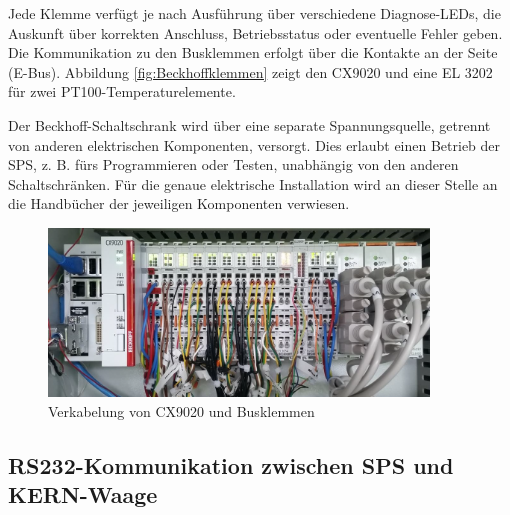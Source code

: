 Jede Klemme verfügt je nach Ausführung über verschiedene Diagnose-LEDs, die Auskunft über korrekten Anschluss, Betriebsstatus oder eventuelle Fehler geben. Die Kommunikation zu den Busklemmen erfolgt über die Kontakte an der Seite (E-Bus). Abbildung \ref{fig:Beckhoffklemmen} zeigt den CX9020 und eine EL 3202 für zwei PT100-Temperaturelemente. 

Der Beckhoff-Schaltschrank wird über eine separate Spannungsquelle, getrennt von anderen elektrischen Komponenten,  versorgt. Dies erlaubt einen Betrieb der SPS, z. B. fürs Programmieren oder Testen, unabhängig von den anderen Schaltschränken. Für die genaue elektrische Installation wird an dieser Stelle an die Handbücher der jeweiligen Komponenten verwiesen. \citep{MicroNovaAG2011} \citep{KMGH2013} \citep{KERN2006} \citep{KELLER2015} \citep{CAREL2015}

\begin{figure}[htb]
\centering		\includegraphics[width=0.90\textwidth]{Pictures/Versuchsaufbau/SPS_BILD.png}
\caption{Verkabelung von CX9020 und Busklemmen}
\label{fig:}
\end{figure}

\newpage
\subsection{RS232-Kommunikation zwischen SPS und KERN-Waage}
\label{subsec:RS232-Verbindung}




